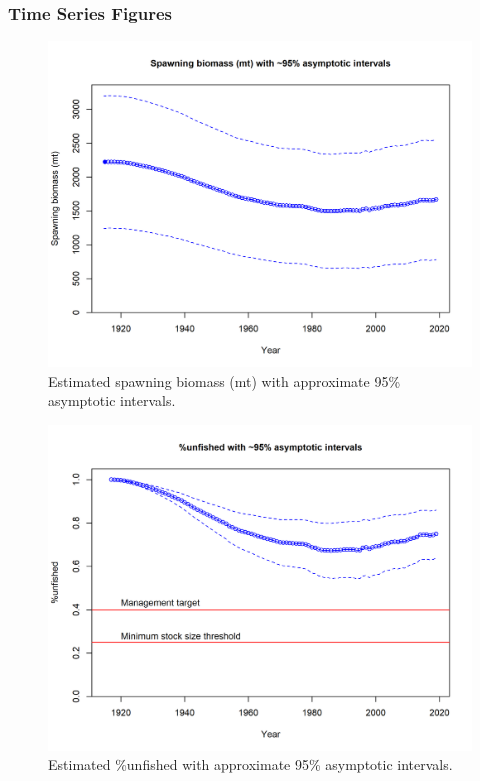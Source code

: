 \documentclass[12pt,]{article}
\begin{document}
\FloatBarrier

\newpage

\hypertarget{time-series-figures}{%
\subsubsection{Time Series Figures}\label{time-series-figures}}

\FloatBarrier

\vspace{.5cm}

\begin{figure}
\centering
\includegraphics{r4ss/plots_mod1/ts7_Spawning_biomass_(mt)_with_95_asymptotic_intervals_intervals.png}
\caption{Estimated spawning biomass (mt) with approximate 95\%
asymptotic intervals.
\label{fig:ts7_Spawning_biomass_(mt)_with_95_asymptotic_intervals_intervals}}
\end{figure}

\begin{figure}
\centering
\includegraphics{r4ss/plots_mod1/ts9_unfished_with_95_asymptotic_intervals_intervals.png}
\caption{Estimated \%unfished with approximate 95\% asymptotic
intervals.
\label{fig:ts9_unfished_with_95_asymptotic_intervals_intervals}}
\end{figure}
\end{document}
